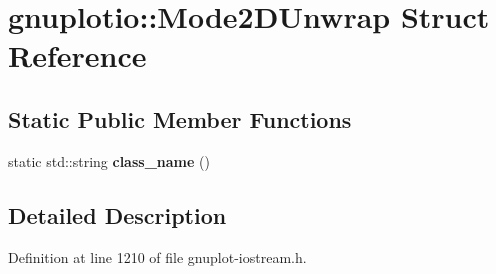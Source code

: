\hypertarget{structgnuplotio_1_1_mode2_d_unwrap}{}\section{gnuplotio\+:\+:Mode2\+D\+Unwrap Struct Reference}
\label{structgnuplotio_1_1_mode2_d_unwrap}
\subsection*{Static Public Member Functions}
\begin{DoxyCompactItemize}
\item 
static std\+::string {\bfseries class\+\_\+name} ()\hypertarget{structgnuplotio_1_1_mode2_d_unwrap_ab2f533c9ceb52cfecaa161c64316deb9}{}\label{structgnuplotio_1_1_mode2_d_unwrap_ab2f533c9ceb52cfecaa161c64316deb9}

\end{DoxyCompactItemize}


\subsection{Detailed Description}


Definition at line 1210 of file gnuplot-\/iostream.\+h.

